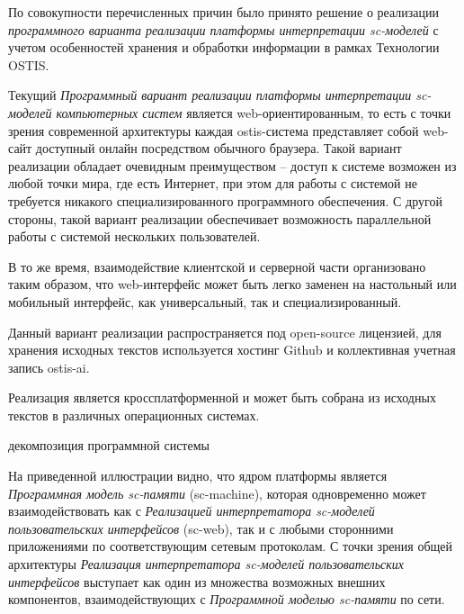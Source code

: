 По совокупности перечисленных причин было принято решение о реализации \textit{программного варианта реализации
платформы интерпретации sc-моделей}  с учетом особенностей хранения и обработки информации в рамках
Технологии OSTIS.

Текущий \textit{Программный вариант реализации платформы интерпретации sc-моделей компьютерных систем} является
web-ориентированным, то есть с точки зрения современной архитектуры каждая \mbox{ostis-система} представляет собой
web-сайт доступный онлайн посредством обычного браузера. Такой вариант реализации обладает очевидным преимуществом --
доступ к системе возможен из любой точки мира, где есть Интернет, при этом для работы с системой не требуется никакого
специализированного программного обеспечения. С другой стороны, такой вариант реализации обеспечивает возможность
параллельной работы с системой нескольких пользователей.

В то же время, взаимодействие клиентской и серверной части организовано таким образом, что \mbox{web-интерфейс} может
быть легко заменен на настольный или мобильный интерфейс, как универсальный, так и специализированный.

Данный вариант реализации распространяется под open-source лицензией, для хранения исходных текстов используется
хостинг Github и коллективная учетная запись ostis-ai.

Реализация является кроссплатформенной и может быть собрана из исходных текстов в различных операционных системах.

\begin{SCn}
\begin{scnrelfromset}{декомпозиция программной системы}
\end{scnrelfromset}
\end{SCn}

На приведенной иллюстрации видно, что ядром платформы является \textit{Программная модель sc-памяти} (sc-machine),
которая одновременно может взаимодействовать как с \textit{Реализацией интерпретатора sc-моделей пользовательских
интерфейсов} (sc-web), так и с любыми сторонними приложениями по соответствующим сетевым протоколам. С точки зрения
общей архитектуры \textit{Реализация интерпретатора sc-моделей пользовательских интерфейсов} выступает как один из
множества возможных внешних компонентов, взаимодействующих с \textit{Программной моделью sc-памяти} по сети.

